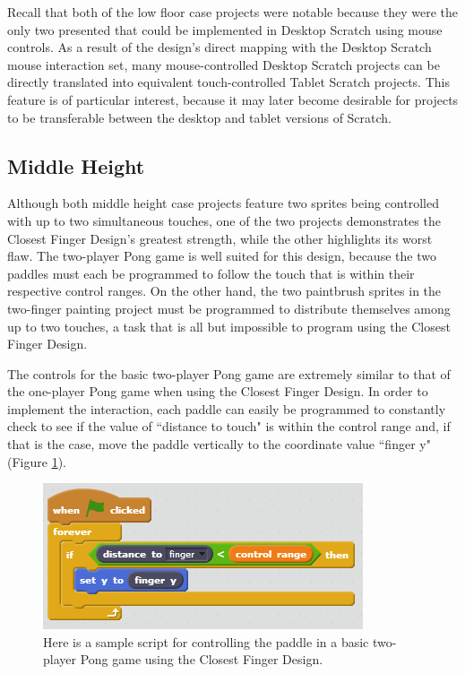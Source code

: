 Recall that both of the low floor case projects were notable because they were the only two presented that could be implemented in Desktop Scratch using mouse controls. As a result of the design's direct mapping with the Desktop Scratch mouse interaction set, many mouse-controlled Desktop Scratch projects can be directly translated into equivalent touch-controlled Tablet Scratch projects. This feature is of particular interest, because it may later become desirable for projects to be transferable between the desktop and tablet versions of Scratch.

\subsection{Middle Height}

Although both middle height case projects feature two sprites being controlled with up to two simultaneous touches, one of the two projects demonstrates the Closest Finger Design's greatest strength, while the other highlights its worst flaw. The two-player Pong game is well suited for this design, because the two paddles must each be programmed to follow the touch that is within their respective control ranges. On the other hand, the two paintbrush sprites in the two-finger painting project must be programmed to distribute themselves among up to two touches, a task that is all but impossible to program using the Closest Finger Design.

The controls for the basic two-player Pong game are extremely similar to that of the one-player Pong game when using the Closest Finger Design. In order to implement the interaction, each paddle can easily be programmed to constantly check to see if the value of ``distance to touch" is within the control range and, if that is the case, move the paddle vertically to the coordinate value ``finger y" (Figure \ref{BasicTwoPlayerPongCFD}). 

\begin{figure}
\centering
\includegraphics{images/BasicTwoPlayerPongCFD.PNG}
\caption[Sample Closest Finger Design Script For Basic Two-Player Pong]{Here is a sample script for controlling the paddle in a basic two-player Pong game using the Closest Finger Design.}
\label{BasicTwoPlayerPongCFD}
\end{figure}

